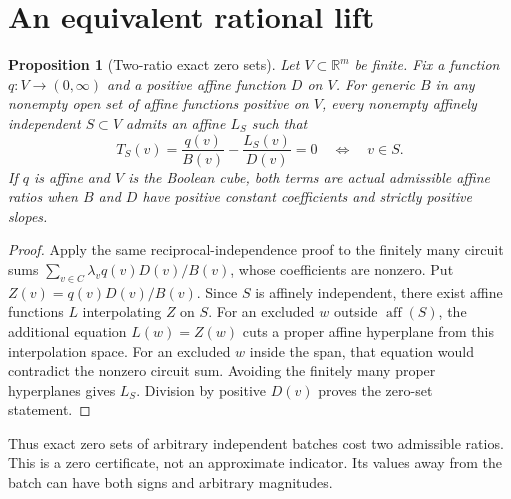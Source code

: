 \documentclass[11pt]{article}
\newtheorem{proposition}{Proposition}
\begin{document}
\section{An equivalent rational lift}

\begin{proposition}[Two-ratio exact zero sets]
Let $V\subset\mathbb R^m$ be finite. Fix a function $q:V\to(0,\infty)$
and a positive affine function $D$ on $V$. For generic $B$ in any
nonempty open set of affine functions positive on $V$, every
nonempty affinely independent $S\subset V$ admits an affine $L_S$
such that
\[
 T_S(v)=\frac{q(v)}{B(v)}-\frac{L_S(v)}{D(v)}=0
 \quad\Longleftrightarrow\quad v\in S.
\]
If $q$ is affine and $V$ is the Boolean cube, both terms are actual
admissible affine ratios when $B$ and $D$ have positive constant
coefficients and strictly positive slopes.
\end{proposition}

\begin{proof}
Apply the same reciprocal-independence proof to the finitely many
circuit sums
$\sum_{v\in C}\lambda_v q(v)D(v)/B(v)$, whose coefficients are
nonzero. Put $Z(v)=q(v)D(v)/B(v)$. Since $S$ is affinely independent,
there exist affine functions $L$ interpolating $Z$ on $S$.
For an excluded $w$ outside $\operatorname{aff}(S)$, the additional
equation $L(w)=Z(w)$ cuts a proper affine hyperplane from this
interpolation space. For an excluded $w$ inside the span, that
equation would contradict the nonzero circuit sum. Avoiding the
finitely many proper hyperplanes gives $L_S$. Division by positive
$D(v)$ proves the zero-set statement.
\end{proof}

Thus exact zero sets of arbitrary independent batches cost two
admissible ratios. This is a zero certificate, not an approximate
indicator. Its values away from the batch can have both signs and
arbitrary magnitudes.
\end{document}
